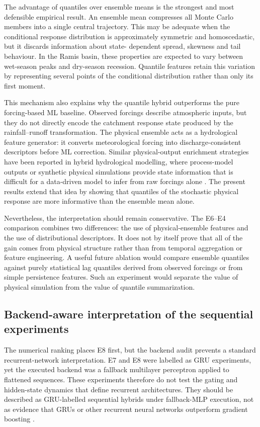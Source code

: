 \documentclass[a4paper,fleqn]{cas-sc}
\begin{document}
The advantage of quantiles over ensemble means is the strongest and
most defensible empirical result. An ensemble mean compresses all
Monte Carlo members into a single central trajectory. This may be
adequate when the conditional response distribution is approximately
symmetric and homoscedastic, but it discards information about state-
dependent spread, skewness and tail behaviour. In the Ramis basin,
these properties are expected to vary between wet-season peaks and
dry-season recession. Quantile features retain this variation by
representing several points of the conditional distribution rather than
only its first moment.

This mechanism also explains why the quantile hybrid outperforms the
pure forcing-based ML baseline. Observed forcings describe atmospheric
inputs, but they do not directly encode the catchment response state
produced by the rainfall--runoff transformation. The physical ensemble
acts as a hydrological feature generator: it converts meteorological
forcing into discharge-consistent descriptors before ML correction.
Similar physical-output enrichment strategies have been reported in
hybrid hydrological modelling, where process-model outputs or synthetic
physical simulations provide state information that is difficult for a
data-driven model to infer from raw forcings alone
\citep{mekonnen2015hybrid,yang2020physical,xie2021physics,li2024process,zhu2025hybrid}. The present results extend that idea by showing that
quantiles of the stochastic physical response are more informative than
the ensemble mean alone.

Nevertheless, the interpretation should remain conservative. The
E6--E4 comparison combines two differences: the use of physical-ensemble
features and the use of distributional descriptors. It does not by
itself prove that all of the gain comes from physical structure rather
than from temporal aggregation or feature engineering. A useful future
ablation would compare ensemble quantiles against purely statistical lag
quantiles derived from observed forcings or from simple persistence
features. Such an experiment would separate the value of physical
simulation from the value of quantile summarization.

\subsection{Backend-aware interpretation of the sequential experiments}
\label{subsec:discussion-backend}

The numerical ranking places E8 first, but the backend audit prevents a
standard recurrent-network interpretation. E7 and E8 were labelled as
GRU experiments, yet the executed backend was a fallback multilayer
perceptron applied to flattened sequences. These experiments therefore
do not test the gating and hidden-state dynamics that define recurrent
architectures. They should be described as GRU-labelled sequential
hybrids under fallback-MLP execution, not as evidence that GRUs or other
recurrent neural networks outperform gradient boosting
\citep{kratzert2018rainfall,kratzert2019towards}.
\end{document}
